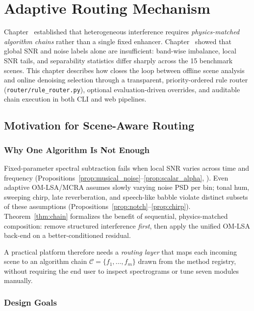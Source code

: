 \chapter{Adaptive Routing Mechanism}
\label{ch:routing}

Chapter~ established that heterogeneous interference requires \emph{physics-matched algorithm chains} rather than a single fixed enhancer. Chapter~ showed that global SNR and noise labels alone are insufficient: band-wise imbalance, local SNR tails, and separability statistics differ sharply across the 15 benchmark scenes. This chapter describes how \projectshort{} closes the loop between offline scene analysis and online denoising selection through a transparent, priority-ordered rule router (\texttt{router/rule\_router.py}), optional evaluation-driven overrides, and auditable chain execution in both CLI and web pipelines.

\section{Motivation for Scene-Aware Routing}
\label{sec:routing_motivation}

\subsection{Why One Algorithm Is Not Enough}

Fixed-parameter spectral subtraction fails when local SNR varies across time and frequency (Propositions~\ref{prop:musical_noise}--\ref{prop:scalar_alpha}, ). Even adaptive OM-LSA/MCRA assumes slowly varying noise PSD per bin; tonal hum, sweeping chirp, late reverberation, and speech-like babble violate distinct subsets of these assumptions (Propositions~\ref{prop:notch}--\ref{prop:chirp}). Theorem~\ref{thm:chain} formalizes the benefit of sequential, physics-matched composition: remove structured interference \emph{first}, then apply the unified OM-LSA back-end on a better-conditioned residual.

A practical platform therefore needs a \emph{routing layer} that maps each incoming scene to an algorithm chain $\mathcal{C}=\{f_1,\ldots,f_m\}$ drawn from the method registry, without requiring the end user to inspect spectrograms or tune seven modules manually.

\subsection{Design Goals}

